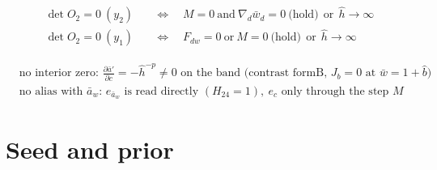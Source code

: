 \documentclass[11pt,a4paper,fontset=none]{ctexart}
\newcommand{\ba}{\bar{a}}
\newcommand{\bw}{\bar{w}}
\newcommand{\ap}{\ba'}
\newcommand{\hh}{\hat{h}}
\begin{document}
\begin{align*}
\det O_2 = 0 \ (y_2) \quad&\Longleftrightarrow\quad M = 0 \ \text{and}\ \nabla_d\bw_d = 0 \ \text{(hold)} \ \ \text{or}\ \ \hh \to \infty \\
\det O_2 = 0 \ (y_1) \quad&\Longleftrightarrow\quad F_{dw} = 0 \ \text{or}\ M = 0 \ \text{(hold)} \ \ \text{or}\ \ \hh \to \infty
\end{align*}

\begin{align*}
&\text{no interior zero: } \frac{\partial\ap}{\partial c} = -\hh^{-p} \ne 0 \text{ on the band (contrast formB, } J_b = 0 \text{ at } \bw = 1 + \hat b\text{)} \\
&\text{no alias with } \ba_w\text{: } e_{\ba_w} \text{ is read directly } (H_{24} = 1), \ e_c \text{ only through the step } M
\end{align*}

\section*{Seed and prior}
\end{document}
